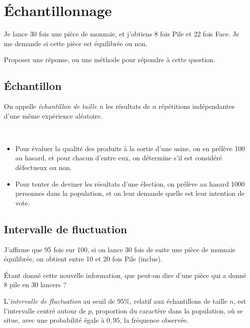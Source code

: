 \chapter{Échantillonnage}
\begin{activite}
  Je lance 30 fois une pièce de monnaie, et j'obtiens 8 fois Pile et 22 fois Face. Je me demande si cette pièce est équilibrée ou non.

  Proposer une réponse, ou une méthode pour répondre à cette question.
\end{activite}

\section{Échantillon}

\begin{definition}
  On appelle \emph{échantillon de taille $n$} les résultats de $n$ répétitions indépendantes d'une même expérience aléatoire.
\end{definition}

\begin{exemple}~
  \begin{itemize}
    \item Pour évaluer la qualité des produits à la sortie d'une usine, on en prélève 100 au hasard, et pour chacun d'entre eux, on détermine s'il est considéré défectueux ou non.
    \item Pour tenter de deviner les résultats d'une élection, on prélève au hasard 1000 personnes dans la population, et on leur demande quelle est leur intention de vote.
  \end{itemize}
\end{exemple}

\section{Intervalle de fluctuation}

\begin{activite}
  J'affirme que 95 fois sur 100, si on lance 30 fois de suite une pièce de monnaie équilibrée, on obtient entre 10 et 20 fois Pile (inclus).

  Étant donné cette nouvelle information, que peut-on dire d'une pièce qui a donné 8 pile en 30 lancers ?
\end{activite}

\begin{definition}
  L'\emph{intervalle de fluctuation} au seuil de 95\%, relatif aux
  échantillons de taille $n$, est l’intervalle centré autour de $p$,
  proportion du caractère dans la population, où se situe, avec une
  probabilité égale à $0,95$, la fréquence observée.
\end{definition}

